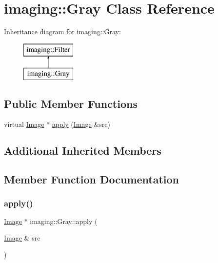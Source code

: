\hypertarget{classimaging_1_1_gray}{}\section{imaging\+:\+:Gray Class Reference}
\label{classimaging_1_1_gray}
Inheritance diagram for imaging\+:\+:Gray\+:\begin{figure}[H]
\begin{center}
\leavevmode
\includegraphics[height=2.000000cm]{classimaging_1_1_gray}
\end{center}
\end{figure}
\subsection*{Public Member Functions}
\begin{DoxyCompactItemize}
\item 
virtual \hyperlink{classimaging_1_1_image}{Image} $\ast$ \hyperlink{classimaging_1_1_gray_a12fb554726775cf110acfa73c468caee}{apply} (\hyperlink{classimaging_1_1_image}{Image} \&src)
\end{DoxyCompactItemize}
\subsection*{Additional Inherited Members}


\subsection{Member Function Documentation}
\mbox{\label{classimaging_1_1_gray_a12fb554726775cf110acfa73c468caee}} 
\subsubsection{\texorpdfstring{apply()}{apply()}}
{\footnotesize\ttfamily \hyperlink{classimaging_1_1_image}{Image} $\ast$ imaging\+::\+Gray\+::apply (\begin{DoxyParamCaption}\item[{\hyperlink{classimaging_1_1_image}{Image} \&}]{src }\end{DoxyParamCaption})\hspace{0.3cm}{\ttfamily [virtual]}}

